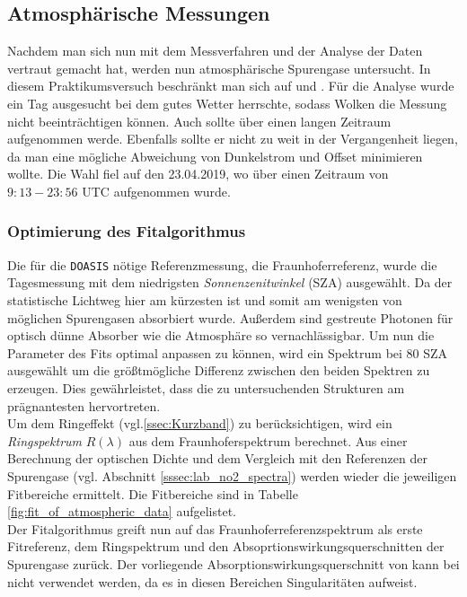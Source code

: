 \documentclass[12pt, a4paper, bibliography=totoc]{scrartcl}
\begin{document}
\begin{multicols}{2}
\subsection{Atmosphärische Messungen}\label{ssec:atmospheric_measurements}

Nachdem man sich nun mit dem Messverfahren und der Analyse der Daten vertraut gemacht hat, werden nun atmosphärische Spurengase untersucht. In diesem Praktikumsversuch beschränkt man sich auf  und .
Für die Analyse wurde ein Tag ausgesucht bei dem gutes Wetter herrschte, sodass Wolken die Messung nicht beeinträchtigen können. Auch sollte über einen langen Zeitraum aufgenommen werde. Ebenfalls sollte er nicht zu weit in der Vergangenheit liegen, da man eine mögliche Abweichung von Dunkelstrom und Offset minimieren wollte.
Die Wahl fiel auf den 23.04.2019, wo über einen Zeitraum von $9:13 - 23:56$ UTC aufgenommen wurde.

\subsubsection{Optimierung des Fitalgorithmus}\label{sssec:configure_fit}

Die für die \verb*+DOASIS+ nötige Referenzmessung, die Fraunhoferreferenz, wurde die Tagesmessung mit dem niedrigsten
\textit{Sonnenzenitwinkel} (SZA) ausgewählt. 
Da der statistische Lichtweg hier am kürzesten ist und somit am wenigsten von möglichen Spurengasen absorbiert wurde.
Außerdem sind gestreute Photonen für optisch dünne Absorber wie die Atmosphäre so vernachlässigbar.
Um nun die Parameter des Fits optimal anpassen zu können, wird ein Spektrum bei $80$ SZA ausgewählt um die größtmögliche Differenz zwischen den beiden Spektren zu erzeugen. 
Dies gewährleistet, dass die zu untersuchenden Strukturen am prägnantesten hervortreten. \\
Um dem Ringeffekt (vgl.\ref{ssec:Kurzband}) zu berücksichtigen, wird ein \textit{Ringspektrum} $R(\lambda)$ aus dem Fraunhoferspektrum berechnet.
Aus einer Berechnung der optischen Dichte und dem Vergleich mit den Referenzen der Spurengase (vgl. Abschnitt \ref{sssec:lab_no2_spectra}) werden wieder die jeweiligen Fitbereiche ermittelt. 
Die Fitbereiche sind in Tabelle \ref{fig:fit_of_atmospheric_data} aufgelistet.\\
Der Fitalgorithmus greift nun auf das Fraunhoferreferenzspektrum als erste Fitreferenz, dem Ringspektrum und den Absoprtionswirkungsquerschnitten der Spurengase zurück. 
Der vorliegende Absorptionswirkungsquerschnitt von  kann bei  nicht verwendet werden, da es in diesen Bereichen Singularitäten aufweist.


\end{multicols}
\end{document}
